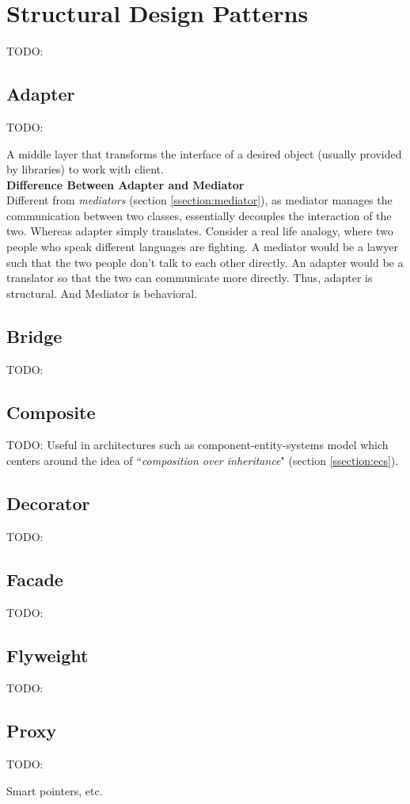 \section{Structural Design Patterns}
TODO:

\subsection{Adapter}
TODO:

A middle layer that transforms the interface of a desired object (usually provided by libraries) to work with client.\bs
\\


\textbf{Difference Between Adapter and Mediator}\bs
\\

Different from \textit{mediators} (section \ref{ssection:mediator}), as mediator manages the communication between two classes, essentially decouples the interaction of the two. Whereas adapter simply translates.
\bs
Consider a real life analogy, where two people who speak different languages are fighting. A mediator would be a lawyer such that the two people don't talk to each other directly. An adapter would be a translator so that the two can communicate more directly. Thus, adapter is structural. And Mediator is behavioral.

\subsection{Bridge}
TODO:

\subsection{Composite}
TODO:
Useful in architectures such as component-entity-systems model which centers around the idea of ``\textit{composition over inheritance}" (section \ref{ssection:ecs}).


\subsection{Decorator}
TODO:

\subsection{Facade}
TODO:

\subsection{Flyweight}
TODO:

\subsection{Proxy}
TODO:

Smart pointers, etc.